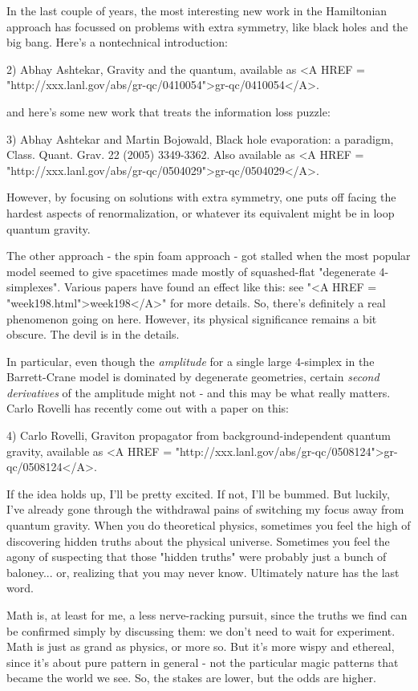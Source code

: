 In the last couple of years, the most interesting new work in the 
Hamiltonian approach has focussed on problems with extra symmetry,
like black holes and the big bang.  Here's a nontechnical 
introduction:

2) Abhay Ashtekar, Gravity and the quantum, available as
<A HREF = "http://xxx.lanl.gov/abs/gr-qc/0410054">gr-qc/0410054</A>.

and here's some new work that treats the information loss
puzzle:

3) Abhay Ashtekar and Martin Bojowald, Black hole evaporation:
a paradigm, Class. Quant. Grav. 22 (2005) 3349-3362.  Also
available as <A HREF = "http://xxx.lanl.gov/abs/gr-qc/0504029">gr-qc/0504029</A>.

However, by focusing on solutions with extra symmetry, one puts 
off facing the hardest aspects of renormalization, or whatever
its equivalent might be in loop quantum gravity.

The other approach - the spin foam approach - got stalled when 
the most popular model seemed to give spacetimes made mostly of 
squashed-flat "degenerate 4-simplexes".  Various papers have
found an effect like this: see "<A HREF = "week198.html">week198</A>" for more details.  So,
there's definitely a real phenomenon going on here.   However, 
its physical significance remains a bit obscure.  The devil is
in the details. 

In particular, even though the \emph{amplitude} for a single large 
4-simplex in the Barrett-Crane model is dominated by degenerate 
geometries, certain \emph{second derivatives} of the amplitude might not -
and this may be what really matters.  Carlo Rovelli has recently
come out with a paper on this:

4) Carlo Rovelli, Graviton propagator from background-independent 
quantum gravity, available as <A HREF = "http://xxx.lanl.gov/abs/gr-qc/0508124">gr-qc/0508124</A>.

If the idea holds up, I'll be pretty excited.  If not, I'll be
bummed.  But luckily, I've already gone through the withdrawal 
pains of switching my focus away from quantum gravity.   When you 
do theoretical physics, sometimes you feel the high of discovering 
hidden truths about the physical universe.  Sometimes you feel the
agony of suspecting that those "hidden truths" were probably just
a bunch of baloney... or, realizing that you may never know.  
Ultimately nature has the last word.  

Math is, at least for me, a less nerve-racking pursuit, since 
the truths we find can be confirmed simply by discussing them: 
we don't need to wait for experiment.  Math is just as grand as 
physics, or more so.  But it's more wispy and ethereal, since it's
about pure pattern in general - not the particular magic patterns 
that became the world we see.  So, the stakes are lower, but the 
odds are higher.

